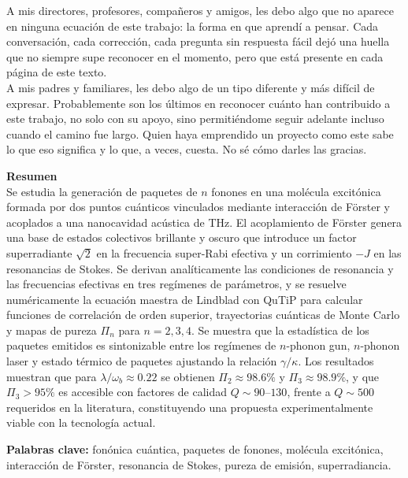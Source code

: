 A mis directores, profesores, compañeros y amigos, les debo algo que no aparece en ninguna ecuación de este trabajo: la forma en que aprendí a pensar. Cada conversación, cada corrección, cada pregunta sin respuesta fácil dejó una huella que no siempre supe reconocer en el momento, pero que está presente en cada página de este texto. \\

A mis padres y familiares, les debo algo de un tipo diferente y más difícil de expresar. Probablemente son los últimos en reconocer cuánto han contribuido a este trabajo, no solo con su apoyo, sino permitiéndome seguir adelante incluso cuando el camino fue largo. Quien haya emprendido un proyecto como este sabe lo que eso significa y lo que, a veces, cuesta. No sé cómo darles las gracias.

\newpage{\pagestyle{empty}\cleardoublepage}

\newpage
{}
\textbf{\LARGE Resumen}\\

Se estudia la generación de paquetes de $n$ fonones en una molécula excitónica formada por dos puntos cuánticos vinculados mediante interacción de Förster y acoplados a una nanocavidad acústica de THz. El acoplamiento de Förster genera una base de estados colectivos brillante y oscuro que introduce un factor superradiante $\sqrt{2}$ en la frecuencia super-Rabi efectiva y un corrimiento $-J$ en las resonancias de Stokes. Se derivan analíticamente las condiciones de resonancia y las frecuencias efectivas en tres regímenes de parámetros, y se resuelve numéricamente la ecuación maestra de Lindblad con QuTiP para calcular funciones de correlación de orden superior, trayectorias cuánticas de Monte Carlo y mapas de pureza $\Pi_n$ para $n=2,3,4$. Se muestra que la estadística de los paquetes emitidos es sintonizable entre los regímenes de $n$-phonon gun, $n$-phonon laser y estado térmico de paquetes ajustando la relación $\gamma/\kappa$. Los resultados muestran que para $\lambda/\omega_b \approx 0.22$ se obtienen $\Pi_2 \approx 98.6\%$ y $\Pi_3 \approx 98.9\%$, y que $\Pi_3 > 95\%$ es accesible con factores de calidad $Q \sim 90$--$130$, frente a $Q \sim 500$ requeridos en la literatura, constituyendo una propuesta experimentalmente viable con la tecnología actual.

\vspace{0.5cm}
\textbf{\small Palabras clave: } fonónica cuántica, paquetes de fonones, molécula excitónica, interacción de Förster, resonancia de Stokes, pureza de emisión, superradiancia. \\

